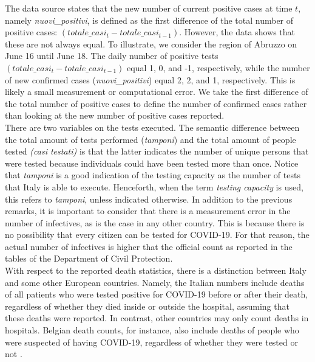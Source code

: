 \documentclass[12pt]{article}
\begin{document}
	The data source states that the new number of current positive cases at time $t$, namely \textit{nuovi\_positivi}, is defined as the first difference of the total number of positive cases: $(totale\_casi_t - totale\_casi_{t-1})$. However, the data shows that these are not always equal. To illustrate, we consider the region of Abruzzo on June 16 until June 18. The daily number of positive tests $(totale\_casi_t - totale\_casi_{t-1})$ equal 1, 0, and -1, respectively, while the number of new confirmed cases (\textit{nuovi\_positivi}) equal 2, 2, and 1, respectively. This is likely a small measurement or computational error. We take the first difference of the total number of positive cases to define the number of confirmed cases rather than looking at the new number of positive cases reported. \\
	
	There are two variables on the tests executed. The semantic difference between the total amount of tests performed (\textit{tamponi}) and the total amount of people tested \textit{(casi testati)} is that the latter indicates the number of unique persons that were tested because individuals could have been tested more than once. Notice that \textit{tamponi} is a good indication of the testing capacity as the number of tests that Italy is able to execute. Henceforth, when the term \textit{testing capacity} is used, this refers to \textit{tamponi}, unless indicated otherwise. In addition to the previous remarks, it is important to consider that there is a measurement error in the number of infectives, as is the case in any other country. This is because there is no possibility that every citizen can be tested for COVID-19. For that reason, the actual number of infectives is higher that the official count as reported in the tables of the Department of Civil Protection. \\
	
	With respect to the reported death statistics, there is a distinction between Italy and some other European countries. Namely, the Italian numbers include deaths of all patients who were tested positive for COVID-19 before or after their death, regardless of whether they died inside or outside the hospital, assuming that these deaths were reported. In contrast, other countries may only count deaths in hospitals. Belgian death counts, for instance, also include deaths of people who were suspected of having COVID-19, regardless of whether they were tested or not \parencite{schultz2020belgiumDeathRate}. \\
	
\end{document}
